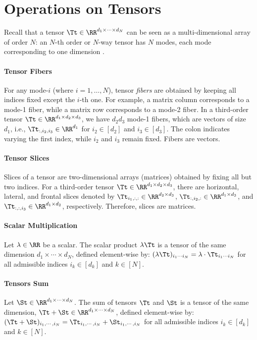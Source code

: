 \section{Operations on Tensors}\label{chapter:operations}
Recall that a tensor $\Tt \in \RR^{d_1 \times \cdots \times d_N}$ can be seen as a multi-dimensional array of order $N$: an $N$-th order or $N$-way tensor has $N$ modes, each mode corresponding to one dimension \citep{kolda2009tensor}.
\paragraph{Tensor Fibers} For any mode-$i$ (where $i = 1, \dots, N$), tensor \textit{fibers} are obtained by keeping all indices fixed except the $i$-th one. For example, a matrix column corresponds to a mode-1 fiber, while a matrix row corresponds to a mode-2 fiber. In a third-order tensor $\Tt \in \RR^{d_1 \times d_2 \times d_3}$, we have $d_2d_3$ mode-1 fibers, which are vectors of size $d_1$, i.e., $\Tt_{:,i_2,i_3} \in \RR^{d_1}$ for $i_2 \in [d_2]$ and $i_3 \in [d_3]$. The colon indicates varying the first index, while $i_2$ and $i_3$ remain fixed. Fibers are vectors.
\paragraph{Tensor Slices} Slices of a tensor are two-dimensional arrays (matrices) obtained by fixing all but two indices. For a third-order tensor $\Tt \in \RR^{d_1 \times d_2 \times d_3}$, there are horizontal, lateral, and frontal slices denoted by $\Tt_{i_1,:,:} \in \RR^{d_2 \times d_3}$, $\Tt_{:,i_2,:} \in \RR^{d_1 \times d_3}$, and $\Tt_{:,:,i_3} \in \RR^{d_1 \times d_2}$, respectively. Therefore, slices are matrices.
\paragraph{Scalar Multiplication} 
Let $\lambda \in \RR$ be a scalar. The scalar product $\lambda\Tt$ 
 is a tensor of the same dimension $d_1 \times \cdots \times d_N$, defined element-wise by:
$
    (\lambda\Tt)_{i_1 \cdots i_N} = \lambda \cdot \Tt_{i_1 \cdots i_N}$
for all admissible indices $i_k\in[d_k]$ and $k\in[N]$.
\paragraph{Tensors Sum} Let $\St\in\RR^{d_1\times\cdots\times d_N}$. The sum of tensors $\Tt$ and $\St$ is a tensor of the same dimension, $\Tt+\St\in\RR^{d_1\times\cdots\times d_N}$, defined element-wise by: $(\Tt+\St)_{i_1,\cdots,i_N} = \Tt_{i_1,\cdots,i_N} + \St_{i_1,\cdots,i_N}$ for all admissible indices $i_k\in[d_k]$ and $k\in[N]$.
